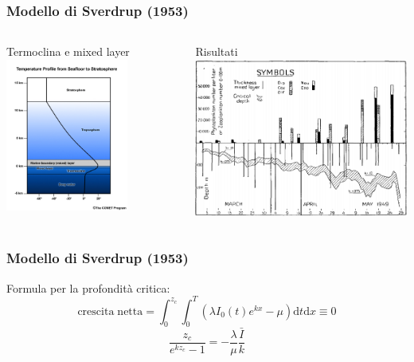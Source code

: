 \begin{frame}
  \frametitle{Modello di Sverdrup (1953)}
  \begin{columns}

 Termoclina e mixed layer
    \includegraphics[width=0.7\textwidth]{../img/temp_profile}

    Risultati
    \includegraphics[width=\textwidth]{../img/Sverdrup_result}

  \end{columns}
\end{frame}
\begin{frame}
  \frametitle{Modello di Sverdrup (1953)}
  Formula per la profondità critica:
  \[ \mathrm{crescita \; netta} = \int_0^{z_c} \int_0^T (\lambda I_0(t) e^{kx} - \mu )\mathrm{d}t \mathrm{d}x \equiv 0 \]
  \[ \frac{z_c}{e^{kz_c}-1} =-\frac{\lambda}{\mu}\frac{\bar{I}}{k} \]

\end{frame}

